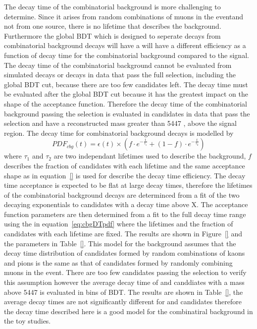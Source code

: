 {The decay time \pdf of the combinatorial background is more challenging to determine. Since it arises from random combinations of muons in the eventand not from one source, there is no lifetime that describes the background. Furthermore the global BDT which is designed to seperate \bsmumu decays from combinatorial background decays will have a will have a different efficiency as a function of decay time for the combinatorial background compared to the \bsmum signal. The decay time \pdf of the combinatorial background cannot be evaluated from simulated decays or decays in data that pass the full \bsmumu selection, including the global BDT cut, because there are too few candidates left. The decay time \pdf must be evaluated after the global BDT cut because it has the greatest impact on the shape of the acceptance function. Therefore the decay time \pdf of the combinatorial background passing the \bsmumu selection is evaluated in candidates in data that pass the \bhh selection and have a reconstructed mass greater than 5447 \mevcc, above the \bs signal region. The decay time \pdf for combinatorial background decays is modelled by
\begin{equation}
PDF_{cbg}(t) = \epsilon(t)\times \left( f \cdot e^{-\frac{t}{\tau_{1}}} + (1-f)\cdot e^{-\frac{t}{\tau_{2}}} \right)
\label{eq:cbgDTpdf}
\end{equation}
where $\tau_{1}$ and $\tau_{2}$ are two independant lifetimes used to describe the background, $f$ describes the fraction of candidates with each lifetime and the same acceptance shape as in equation~\ref{} is used for describe the decay time efficiency. The decay time acceptance is expected to be flat at large decay times, therefore the lifetimes of the combinatorial background decays are determinced from a \ml fit of the two decaying exponentials to candidates with a decay time above X. The acceptance function parameters are then determined from a \ml fit to the full decay time range using the \pdf in equation~\ref{eq:cbgDTpdf} where the lifetimes and the fraction of candidates with each lifetime are fixed. The results are shown in Figure~\ref{} and the \pdf parameters in Table~\ref{}. This model for the background assumes that the decay time distribution of \bhh candidates formed by random combinations of kaons and pions is the same as that of \bsmumu candidates formed by randomly combining muons in the event. There are too few candidates passing the \bsmumu selection to verify this assumption however the average decay time of \bhh and \bsmumu canddiates with a mass above 5447 \mevcc is evaluated in bins of BDT. The results are shown in Table~\ref{}, the average decay times are not significantly different for \bhh and \bsmumu candidates therefore the decay time \pdf described here is a good model for the combinatiral background in the toy studies.





}
